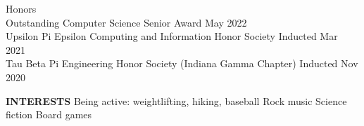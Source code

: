 \documentclass{resume} %
\begin{document}
\begin{rSection}{Honors}
\\ { Outstanding Computer Science Senior Award } \hfill { May 2022 }
\vspace{0.1em}
\\ { Upsilon Pi Epsilon Computing and Information Honor Society } \hfill { Inducted Mar 2021 $\,\!\!$}
\vspace{0.1em}
\\ { Tau Beta Pi Engineering Honor Society (Indiana Gamma Chapter) } \hfill { Inducted Nov 2020 $\,$}
\end{rSection}

{\bf INTERESTS} \hspace{1em} Being active: weightlifting, hiking, baseball \hspace{1em} Rock music \hspace{1em} Science fiction \hspace{1em} Board games %

\end{document}
